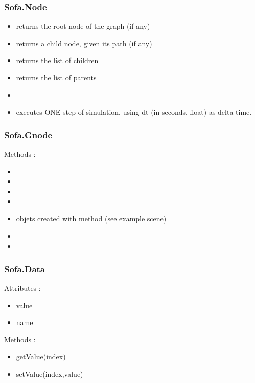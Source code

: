 \subsubsection{Sofa.Node}
\begin{itemize}
\item {} returns the root node of the graph (if any) 
\item {} returns a child node, given its path (if any) 
\item {} returns the list of children 
\item {} returns the list of parents
\item {} 
\item {} executes ONE step of simulation, using dt (in seconds, float) as delta time. 
\end{itemize}
\subsubsection{Sofa.Gnode}
Methods :
\begin{itemize}
\item {} 
\item {} 
\item {} 
\item {} 
\item {} objets created with  method  (see example scene)
\item {} 
\item {} 
\end{itemize}


\subsubsection{Sofa.Data}
Attributes :
\begin{itemize}
\item value
\item name
\end{itemize}
Methods :
\begin{itemize}
\item getValue(index)
\item setValue(index,value)
\end{itemize}

